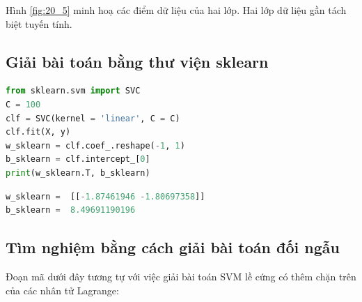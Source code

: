 Hình \ref{fig:20_5} minh hoạ các điểm dữ liệu của hai lớp. Hai lớp dữ liệu gần tách biệt tuyến tính. 
 
 
\subsection{Giải bài toán bằng thư viện sklearn}

\begin{lstlisting}[language=Python]
from sklearn.svm import SVC 
C = 100 
clf = SVC(kernel = 'linear', C = C) 
clf.fit(X, y)  
w_sklearn = clf.coef_.reshape(-1, 1) 
b_sklearn = clf.intercept_[0] 
print(w_sklearn.T, b_sklearn) 
\end{lstlisting}
\kq
\begin{lstlisting}[language=Python]
w_sklearn =  [[-1.87461946 -1.80697358]]
b_sklearn =  8.49691190196
\end{lstlisting}
 
 
\subsection{Tìm nghiệm bằng cách giải bài toán đối ngẫu }

Đoạn mã dưới đây tương tự với việc giải bài toán SVM lề cứng có thêm chặn trên của các nhân tử Lagrange:
 
